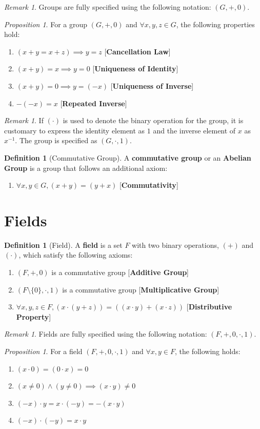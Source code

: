 \documentclass[a4paper,12pt]{report}
\newcommand{\tb}{\textbf}
\theoremstyle{plain}
\theoremstyle{definition}
\newtheorem{definition}[theorem]{\color{red}Definition} %
\theoremstyle{remark}
\newtheorem{remark}[theorem]{\color{ForestGreen}Remark} %
\newtheorem{proposition}[theorem]{\color{Brown}Proposition} %
\begin{document}
\begin{remark}
Groups are fully specified using the following notation: $(G,+,0)$.
\end{remark}
\begin{proposition}
For a group $(G,+,0)$ and $\forall x,y,z\in G$, the following properties hold:
\begin{enumerate}
\item $(x+y=x+z)\implies y=z$ [\tb{Cancellation Law}]
\item $(x+y)=x\implies y=0$ [\tb{Uniqueness of Identity}]
\item $(x+y)=0\implies y=(-x)$ [\tb{Uniqueness of Inverse}]
\item $-(-x)=x$ [\tb{Repeated Inverse}]
\end{enumerate}
\end{proposition}
\begin{remark}
If $(\cdot)$ is used to denote the binary operation for the group, it is customary to express the identity element as $1$ and the inverse element of $x$ as $x^{-1}$. The group is specified as $(G,\cdot,1)$.
\end{remark}
\begin{definition}[Commutative Group]
A \tb{commutative group} or an \tb{Abelian Group} is a group that follows an additional axiom:
\begin{enumerate}
\item $\forall x,y\in G, (x+y)=(y+x)$ [\tb{Commutativity}]
\end{enumerate}
\end{definition}

\section{Fields}
\begin{definition}[Field]
A \tb{field} is a set $F$ with two binary operations, $(+)$ and $(\cdot)$, which satisfy the following axioms:
\begin{enumerate}
\item $(F,+,0)$ is a commutative group [\tb{Additive Group}]
\item $(F\setminus\{0\},\cdot,1)$ is a commutative group [\tb{Multiplicative Group}]
\item $\forall x,y,z\in F, (x\cdot(y+z))=((x\cdot y)+(x\cdot z))$ [\tb{Distributive Property}]
\end{enumerate}
\end{definition}
\begin{remark}
Fields are fully specified using the following notation: $(F,+,0,\cdot,1)$.
\end{remark}
\begin{proposition}
For a field $(F,+,0,\cdot,1)$ and $\forall x,y\in F$, the following holds:
\begin{enumerate}
\item $(x\cdot 0)=(0\cdot x)=0$
\item $(x\neq 0)\wedge(y\neq 0)\implies (x\cdot y)\neq 0$
\item $(-x)\cdot y=x\cdot(-y)=-(x\cdot y)$
\item $(-x)\cdot(-y)=x\cdot y$
\end{enumerate}
\end{proposition}
\end{document}
